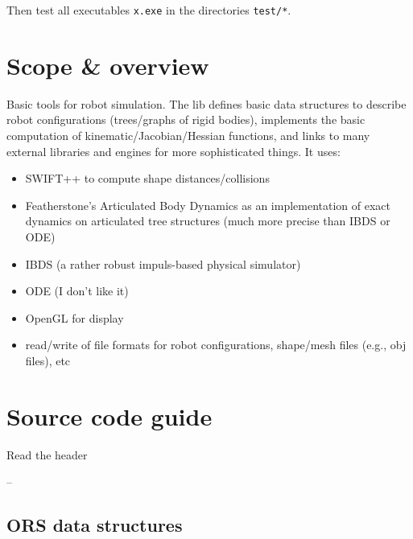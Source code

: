 Then test all executables \verb!x.exe! in the directories \verb!test/*!.


\section{Scope \& overview}

Basic tools for robot simulation. The lib defines basic data
structures to describe robot configurations (trees/graphs of rigid
bodies), implements the basic computation of
kinematic/Jacobian/Hessian functions, and links to many external
libraries and engines for more sophisticated things. It uses:
\begin{itemize}
\item SWIFT++ to compute shape distances/collisions
\item Featherstone's Articulated Body Dynamics as an implementation of
exact dynamics on articulated tree structures (much more precise than
IBDS or ODE)
\item IBDS (a rather robust impuls-based physical simulator)
\item ODE (I don't like it)
\item OpenGL for display
\item read/write of file formats for robot configurations, shape/mesh
files (e.g., obj files), etc
\end{itemize}


\section{Source code guide}

Read the  header

-- 

\subsection{ORS data structures}

